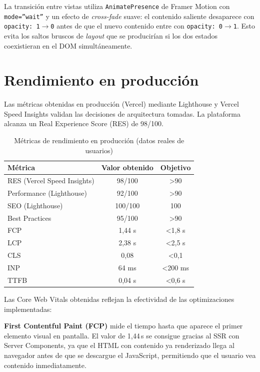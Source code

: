 La transición entre vistas utiliza \texttt{AnimatePresence} de Framer Motion con \texttt{mode=''wait''} y un efecto de \textit{cross-fade} suave: el contenido saliente desaparece con \texttt{opacity: 1$\rightarrow$0} antes de que el nuevo contenido entre con \texttt{opacity: 0$\rightarrow$1}. Esto evita los saltos bruscos de \textit{layout} que se producirían si los dos estados coexistieran en el DOM simultáneamente.

\section{Rendimiento en producción}

Las métricas obtenidas en producción (Vercel) mediante Lighthouse y Vercel Speed Insights validan las decisiones de arquitectura tomadas. La plataforma alcanza un Real Experience Score (RES) de 98/100.

\begin{table}[!htbp]
\begin{center}
\begin{tabular}{| l | c | c |}
\hline
\textbf{Métrica} & \textbf{Valor obtenido} & \textbf{Objetivo} \\ 
\hline
\hline
RES (Vercel Speed Insights) & 98/100 & >90 \\
\hline
Performance (Lighthouse) & 92/100 & >90 \\
\hline
SEO (Lighthouse) & 100/100 & 100 \\
\hline
Best Practices & 95/100 & >90 \\
\hline
FCP & 1,44 s & <1,8 s \\
\hline
LCP & 2,38 s & <2,5 s \\
\hline
CLS & 0,08 & <0,1 \\
\hline
INP & 64 ms & <200 ms \\
\hline
TTFB & 0,04 s & <0,6 s \\
\hline
\end{tabular}
\caption{Métricas de rendimiento en producción (datos reales de usuarios)}
\label{tab:lighthouse}
\end{center}
\end{table}

Las Core Web Vitals obtenidas reflejan la efectividad de las optimizaciones implementadas:

\textbf{First Contentful Paint (FCP)} mide el tiempo hasta que aparece el primer elemento visual en pantalla. El valor de 1,44\,s se consigue gracias al SSR con Server Components, ya que el HTML con contenido ya renderizado llega al navegador antes de que se descargue el JavaScript, permitiendo que el usuario vea contenido inmediatamente.

